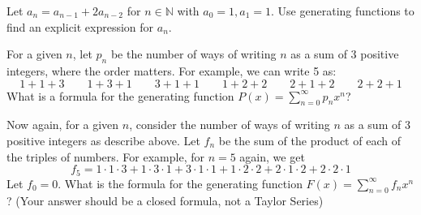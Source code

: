 \documentclass[12pt,twoside]{article}
\begin{document}
\begin{problem}{10}
Let $a_n = a_{n-1} + 2a_{n-2}$ for $n \in \mathbb{N}$ with $a_0 = 1, a_1 = 1$.  Use generating functions to find an explicit expression for $a_n$.  
\end{problem}

\begin{problem}{20}
For a given $n$, let $p_n$ be the number of ways of writing $n$ as a sum of 3 positive integers, where the order matters.  For example, we can write 5 as:
\begin{equation*}
1 + 1 + 3 \qquad 1 + 3 + 1 \qquad 3 + 1 + 1 \qquad 1 + 2 + 2 \qquad 2 + 1 + 2 \qquad 2 + 2 + 1
\end{equation*}
\bparts
{} What is a formula for the generating function $P(x) =  \displaystyle\sum\limits_{n=0}^\infty p_n x^n$?

Now again, for a given $n$, consider the number of ways of writing $n$ as a sum of 3 positive integers as describe above.  Let $f_n$ be the sum of the product of each of the triples of numbers.  For example, for $n = 5$ again, we get 
\begin{equation*}
f_5 = 1 \cdot 1 \cdot 3 + 1 \cdot 3 \cdot 1+ 3 \cdot 1 \cdot 1 + 1 \cdot 2 \cdot 2 + 2 \cdot 1 \cdot 2 + 2 \cdot 2 \cdot 1
\end{equation*} 
%
Let $f_0 = 0$.  
 What is the formula for the generating function $F(x) =  \displaystyle\sum\limits_{n=0}^\infty f_n x^n$? (Your answer should be a closed formula, not a Taylor Series) 

\eparts
\end{problem}


\end{document}
